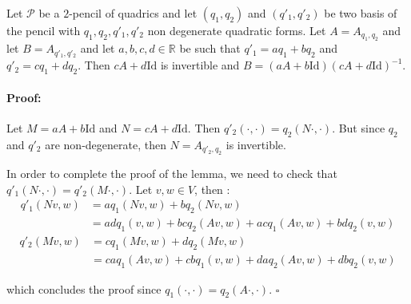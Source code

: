 \documentclass[10pt,a4paper]{amsart}
\newcommand{\Id}{\text{Id}}
\renewenvironment{proof}{\paragraph{Proof:}}{\hfill$\square$ \bigskip}
\begin{document}
\begin{lem}

\label{lem:PSL2ActionPencilBasis}
Let $\mathcal{P}$ be a $2$-pencil of quadrics and let $(q_1,q_2)$ and $(q'_1,q'_2)$ be two basis of the pencil with $q_1,q_2,q'_1,q'_2$ non degenerate quadratic forms. Let $A=A_{q_1,q_2}$ and let $B=A_{q'_1,q'_2}$  and let $a,b,c,d\in \mathbb{R}$ be such that $q'_1=aq_1+bq_2$ and $q'_2=cq_1+dq_2$. Then $cA+d\text{Id}$ is invertible and $B=(aA+b\text{Id})(cA+d\text{Id})^{-1}$.
\end{lem}

\begin{proof}

Let  $M=aA+b\text{Id}$ and $N=cA+d\Id$. Then $q'_2(\cdot,\cdot)=q_2(N\cdot,\cdot)$. But since $q_2$ and $q'_2$ are non-degenerate, then $N=A_{q'_2,q_2}$ is invertible.

\medskip

In order to complete the proof of the lemma, we need to check that $q'_1(N\cdot,\cdot)=q'_2(M\cdot,\cdot)$. Let $v,w\in V$, then :
\begin{equation*} 
\begin{split}
q'_1(Nv,w) & = aq_1(Nv,w)+bq_2(Nv,w) \\
 & = adq_1(v,w)+bcq_2(Av,w)+acq_1(Av,w)+bdq_2(v,w)
\end{split}
\end{equation*}
\begin{equation*} 
\begin{split}
q'_2(Mv,w) & = cq_1(Mv,w)+dq_2(Mv,w) \\
 & = caq_1(Av,w)+cbq_1(v,w)+daq_2(Av,w)+dbq_2(v,w)
\end{split}
\end{equation*}

which concludes the proof since $q_1(\cdot,\cdot)=q_2(A\cdot,\cdot)$.
\end{proof}
\end{document}
